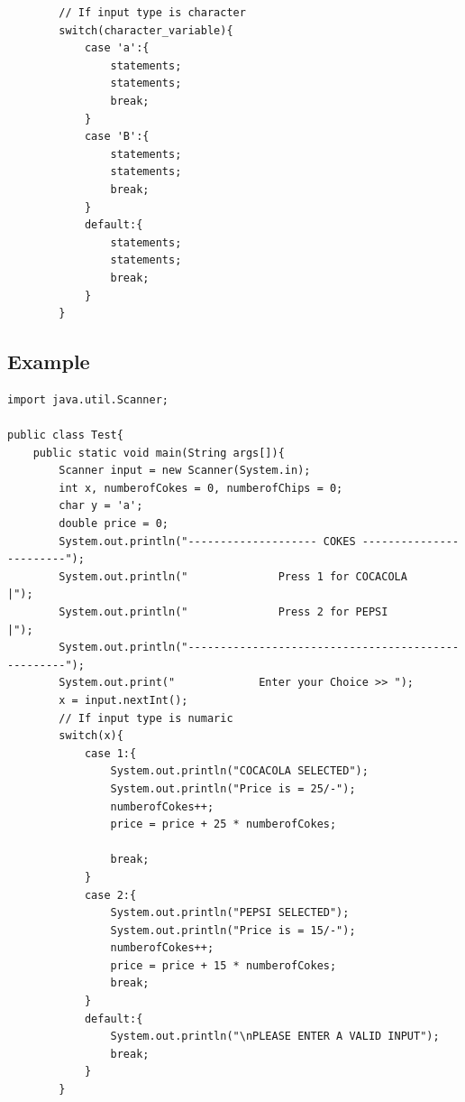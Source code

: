\documentclass[openany]{book}  %
\begin{document}
\begin{flushleft}
\begin{center}
\begin{verbatim}
        // If input type is character
        switch(character_variable){
            case 'a':{
                statements;
                statements;
                break;
            }
            case 'B':{
                statements;
                statements;
                break;
            }
            default:{
                statements;
                statements;
                break;
            }
        }
    \end{verbatim}
    \end{center}
    \subsection{Example}
    \begin{center}
        \footnotesize{
            \begin{verbatim}
import java.util.Scanner;

public class Test{
    public static void main(String args[]){
        Scanner input = new Scanner(System.in);
        int x, numberofCokes = 0, numberofChips = 0;
        char y = 'a';
        double price = 0;
        System.out.println("-------------------- COKES ------------------------");
        System.out.println("              Press 1 for COCACOLA                 |");
        System.out.println("              Press 2 for PEPSI                    |");
        System.out.println("---------------------------------------------------");
        System.out.print("             Enter your Choice >> ");
        x = input.nextInt();
        // If input type is numaric
        switch(x){
            case 1:{
                System.out.println("COCACOLA SELECTED");
                System.out.println("Price is = 25/-");
                numberofCokes++;
                price = price + 25 * numberofCokes;

                break;
            }
            case 2:{
                System.out.println("PEPSI SELECTED");
                System.out.println("Price is = 15/-");
                numberofCokes++;
                price = price + 15 * numberofCokes;
                break;
            }
            default:{
                System.out.println("\nPLEASE ENTER A VALID INPUT");
                break;
            }
        }


\end{verbatim}}
\end{center}
\end{flushleft}
\end{document}
